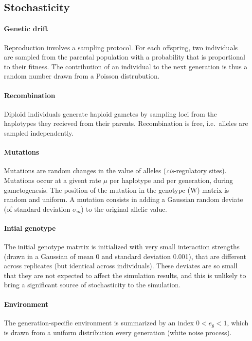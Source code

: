 \documentclass{article}
\begin{document}
\subsection{Stochasticity}

\paragraph{Genetic drift} Reproduction involves a sampling protocol. For each offspring, two individuals are sampled from the parental population with a probability that is proportional to their fitness. The contribution of an individual to the next generation is thus a random number drawn from a Poisson distrubution. 

\paragraph{Recombination} Diploid individuals generate haploid gametes by sampling loci from the haplotypes they recieved from their parents. Recombination is free, i.e.\ alleles are sampled independently. 

\paragraph{Mutations} Mutations are random changes in the value of alleles (\emph{cis}-regulatory sites). Mutations occur at a givent rate $\mu$ per haplotype and per generation, during gametogenesis. The position of the mutation in the genotype ($\mathrm W$) matrix is random and uniform. A mutation consists in adding a Gaussian random deviate (of standard deviation $\sigma_m$) to the original allelic value. 

\paragraph{Intial genotype} The initial genotype matrtix is initialized with very small interaction strengths (drawn in a Gaussian of mean 0 and standard deviation 0.001), that are different across replicates (but identical across individuals). These deviates are so small that they are not expected to affect the simulation results, and this is unlikely to bring a significant source of stochasticity to the simulation.

\paragraph{Environment} The generation-specific environment is summarized by an index $0 < e_g < 1$, which is drawn from a uniform distribution every generation (white noise process).
\end{document}
